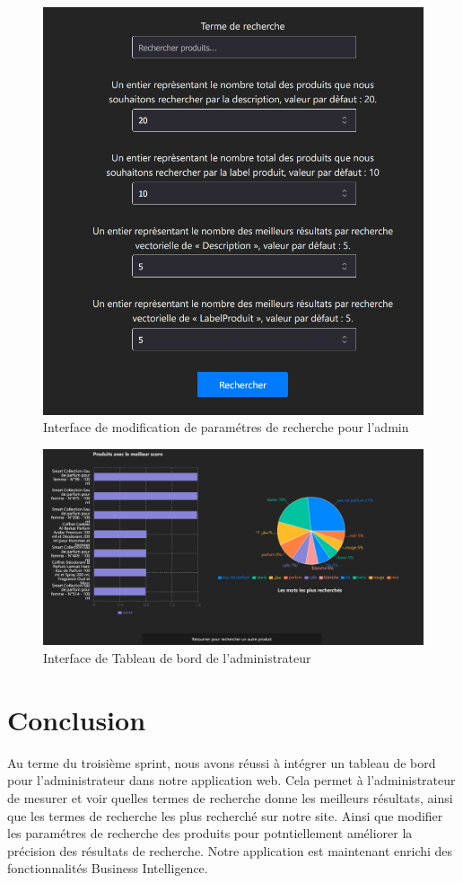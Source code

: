 \begin{figure}[H]
    \centering
    \includegraphics[width=1\textwidth]{logos/knnsearchform.png}
    \caption{Interface de modification de paramétres de recherche pour l'admin}
    \label{fig:knnsearchform}
\end{figure}

\begin{figure}[H]
    \centering
    \includegraphics[width=1\textwidth]{logos/dashboard.png}
    \caption{Interface de Tableau de bord de l'administrateur}
    \label{fig:admindashboard}
\end{figure}


\section{Conclusion}
\noindent
Au terme du troisième sprint, nous avons réussi à intégrer un tableau de bord pour
l'administrateur dans notre application web. Cela permet à l'administrateur de mesurer et voir quelles termes de recherche donne les meilleurs résultats, ainsi que les termes de recherche les plus recherché sur notre site. Ainsi que modifier les paramétres de recherche des produits pour potntiellement améliorer la précision des résultats de recherche. Notre application est maintenant enrichi des fonctionnalités Business Intelligence.

